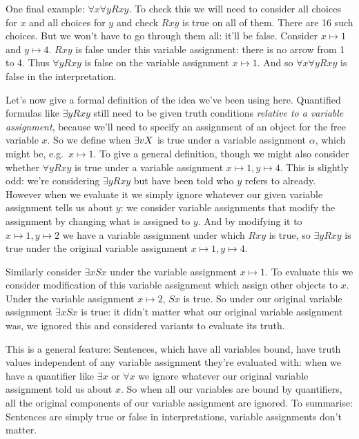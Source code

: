 One final example: $\forall x\forall y Rxy$. To check this we will need to consider all choices for $x$ and all choices for $y$ and check $Rxy$ is true on all of them. There are 16 such choices. But we won't have to go through them all: it'll be false. Consider $x\mapsto 1$ and $y\mapsto 4$. $Rxy$ is false under this variable assignment: there is no arrow from 1 to 4. Thus $\forall yRxy$ is false on the variable assignment $x\mapsto 1$. And so $\forall x\forall y Rxy$ is false in the interpretation. 
 
 Let's now give a formal definition of the idea we've been using here. Quantified formulas like $\exists y Rxy$ still need to be given truth conditions \emph{relative to a variable assignment}, because we'll need to specify an assignment of an object for the free variable $x$. So we define when $\exists vX$ is true under a variable assignment $\alpha$, which might be, e.g.~$x\mapsto 1$. To give a general definition, though we might also consider whether $\forall y Rxy$ is true under a variable assignment $x\mapsto 1, y\mapsto 4$. This is slightly odd: we're considering $\exists y Rxy$ but have been told who $y$ refers to already. However when we evaluate it we simply ignore whatever our given variable assignment tells us about $y$: we consider variable assignments that modify the assignment by changing what is assigned to $y$. And by modifying it to $x\mapsto 1, y\mapsto2$ we have a variable assignment under which $Rxy$ is true, so $\exists y Rxy$ is true under the original variable assignment $x\mapsto 1, y\mapsto 4$.
 
 Similarly consider $\exists x Sx$ under the variable assignment $x\mapsto 1$. To evaluate this we consider modification of this variable assignment which assign other objects to $x$. Under the variable assignment $x\mapsto 2$, $Sx$ is true.  So under our original variable assignment $\exists x Sx$ is true: it didn't matter what our original variable assignment was, we ignored this and considered variants to evaluate its truth.
 
 This is a general feature: Sentences, which have all variables bound, have truth values independent of any variable assignment they're evaluated with: when we have a quantifier like $\exists x$ or $\forall x$ we ignore whatever our original variable assignment told us about $x$. So when all our variables are bound by quantifiers, all the original components of our variable assignment are ignored. To summarise: Sentences are simply true or false in interpretations, variable assignments don't matter. 
 
